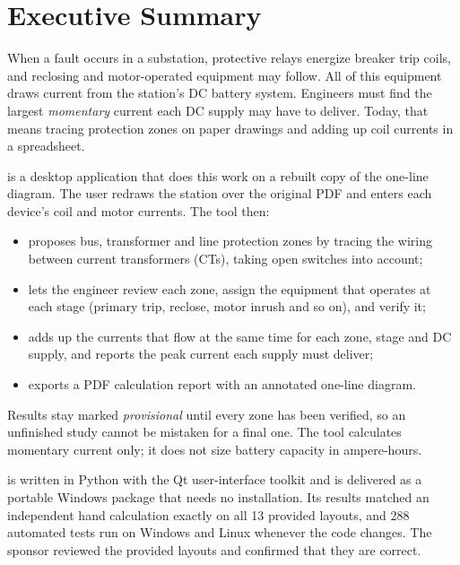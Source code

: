 \section*{Executive Summary}

When a fault occurs in a substation, protective relays energize breaker trip coils,
and reclosing and motor-operated equipment may follow. All of this equipment draws
current from the station's DC battery system. Engineers must find the largest
\emph{momentary} current each DC supply may have to deliver. Today, that means
tracing protection zones on paper drawings and adding up coil currents in a
spreadsheet.

\app{} is a desktop application that does this work on a rebuilt copy of the
one-line diagram. The user redraws the station over the original PDF and enters each
device's coil and motor currents. The tool then:

\begin{itemize}
  \item proposes bus, transformer and line protection zones by tracing the wiring
        between current transformers (CTs), taking open switches into account;
  \item lets the engineer review each zone, assign the equipment that operates at
        each stage (primary trip, reclose, motor inrush and so on), and verify it;
  \item adds up the currents that flow at the same time for each zone, stage and DC
        supply, and reports the peak current each supply must deliver;
  \item exports a PDF calculation report with an annotated one-line diagram.
\end{itemize}

Results stay marked \emph{provisional} until every zone has been verified, so an
unfinished study cannot be mistaken for a final one. The tool calculates momentary
current only; it does not size battery capacity in ampere-hours.

\app{} is written in Python with the Qt user-interface toolkit and is delivered as a
portable Windows package that needs no installation. Its results matched an
independent hand calculation exactly on all 13 provided layouts, and 288 automated
tests run on Windows and Linux whenever the code changes. The sponsor reviewed the
provided layouts and confirmed that they are correct.
